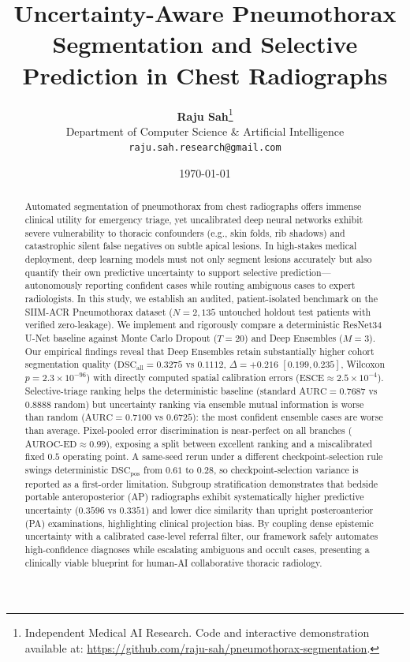 \documentclass[11pt,a4paper]{article}
\title{\textbf{Uncertainty-Aware Pneumothorax Segmentation and Selective Prediction in Chest Radiographs}}
\author{
  \textbf{Raju Sah}\thanks{Independent Medical AI Research. Code and interactive demonstration available at: \url{https://github.com/raju-sah/pneumothorax-segmentation}.} \\
  Department of Computer Science \& Artificial Intelligence \\
  \texttt{raju.sah.research@gmail.com}
}
\date{\today}
\begin{document}
\maketitle

\begin{abstract}
Automated segmentation of pneumothorax from chest radiographs offers immense clinical utility for emergency triage, yet uncalibrated deep neural networks exhibit severe vulnerability to thoracic confounders (e.g., skin folds, rib shadows) and catastrophic silent false negatives on subtle apical lesions. In high-stakes medical deployment, deep learning models must not only segment lesions accurately but also quantify their own predictive uncertainty to support selective prediction—autonomously reporting confident cases while routing ambiguous cases to expert radiologists. In this study, we establish an audited, patient-isolated benchmark on the SIIM-ACR Pneumothorax dataset ($N=2,135$ untouched holdout test patients with verified zero-leakage). We implement and rigorously compare a deterministic ResNet34 U-Net baseline against Monte Carlo Dropout ($T=20$) and Deep Ensembles ($M=3$). Our empirical findings reveal that Deep Ensembles retain substantially higher cohort segmentation quality ($\text{DSC}_{\text{all}} = 0.3275$ vs $0.1112$, $\Delta = +0.216$ $[0.199, 0.235]$, Wilcoxon $p = 2.3 \times 10^{-96}$) with directly computed spatial calibration errors ($\text{ESCE} \approx 2.5 \times 10^{-4}$). Selective-triage ranking helps the deterministic baseline (standard $\text{AURC} = 0.7687$ vs $0.8888$ random) but uncertainty ranking via ensemble mutual information is worse than random ($\text{AURC} = 0.7100$ vs $0.6725$): the most confident ensemble cases are worse than average. Pixel-pooled error discrimination is near-perfect on all branches ($\text{AUROC-ED} \approx 0.99$), exposing a split between excellent ranking and a miscalibrated fixed $0.5$ operating point. A same-seed rerun under a different checkpoint-selection rule swings deterministic $\text{DSC}_{\text{pos}}$ from $0.61$ to $0.28$, so checkpoint-selection variance is reported as a first-order limitation. Subgroup stratification demonstrates that bedside portable anteroposterior (AP) radiographs exhibit systematically higher predictive uncertainty ($0.3596$ vs $0.3351$) and lower dice similarity than upright posteroanterior (PA) examinations, highlighting clinical projection bias. By coupling dense epistemic uncertainty with a calibrated case-level referral filter, our framework safely automates high-confidence diagnoses while escalating ambiguous and occult cases, presenting a clinically viable blueprint for human-AI collaborative thoracic radiology.
\end{abstract}
\end{document}

